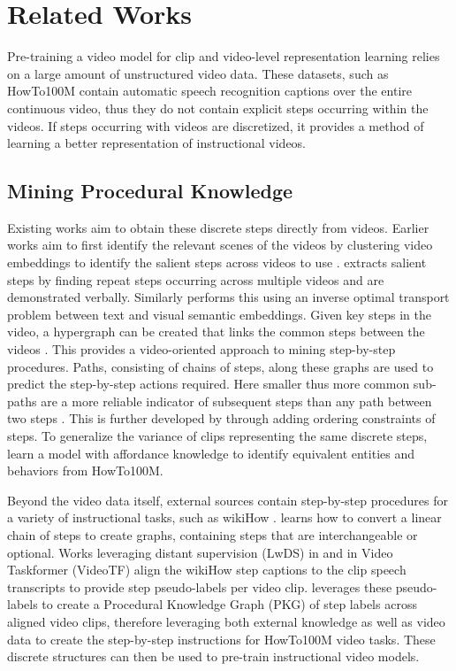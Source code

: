 \section{Related Works}
Pre-training a video model for clip and video-level representation learning relies on a large amount of unstructured video data. These datasets, such as HowTo100M \citep{miech19howto100m} contain automatic speech recognition captions over the entire continuous video, thus they do not contain explicit steps occurring within the videos. If steps occurring with videos are discretized, it provides a method of learning a better representation of instructional videos. 

\subsection{Mining Procedural Knowledge}
Existing works aim to obtain these discrete steps directly from videos. Earlier works aim to first identify the relevant scenes of the videos by clustering video embeddings to identify the salient steps across videos to use \citep{shah2023steps}. \cite{rohrbach2022tl} extracts salient steps by finding repeat steps occurring across multiple videos and are demonstrated verbally. Similarly \cite{wang2023self} performs this using an inverse optimal transport problem between text and visual semantic embeddings. Given key steps in the video, a hypergraph can be created that links the common steps between the videos \citep{bansal2024united}. This provides a video-oriented approach to mining step-by-step procedures. Paths, consisting of chains of steps, along these graphs are used to predict the step-by-step actions required. Here smaller thus more common sub-paths are a more reliable indicator of subsequent steps than any path between two steps \citep{li2023skip}. This is further developed by \cite{zou2024weakly} through adding ordering constraints of steps. To generalize the variance of clips representing the same discrete steps, \cite{yang2023implicit} learn a model with affordance knowledge to identify equivalent entities and behaviors from HowTo100M. 

Beyond the video data itself, external sources contain step-by-step procedures for a variety of instructional tasks, such as wikiHow \citep{koupaee2018wikihow}. \cite{zhou2023non} learns how to convert a linear chain of steps to create graphs, containing steps that are interchangeable or optional. Works leveraging distant supervision (LwDS) in \cite{lwds} and in \cite{videotf} Video Taskformer (VideoTF) align the wikiHow step captions to the clip speech transcripts to provide step pseudo-labels per video clip. \cite{paprika} leverages these pseudo-labels to create a Procedural Knowledge Graph (PKG) of step labels across aligned video clips, therefore leveraging both external knowledge as well as video data to create the step-by-step instructions for HowTo100M video tasks. These discrete structures can then be used to pre-train instructional video models. 

